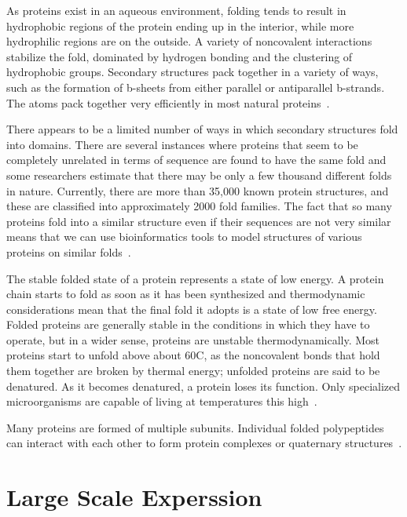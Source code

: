 \documentclass{report}
\begin{document}
As proteins exist in an aqueous environment, folding tends to result in hydrophobic regions of the protein ending up in the interior, while more hydrophilic regions are on the outside. A variety of noncovalent interactions stabilize the fold, dominated by hydrogen bonding and the clustering of hydrophobic groups. Secondary structures pack together in a variety of ways, such as the formation of b-sheets from either parallel or antiparallel b-strands. The atoms pack together very efficiently in most natural proteins~\cite{zvelebil_understanding_2008}.

There appears to be a limited number of ways in which secondary structures fold into domains. There are several instances where proteins that seem to be completely unrelated in terms of sequence are found to have the same fold and some researchers estimate that there may be only a few thousand different folds in nature. Currently, there are more than 35,000 known protein structures, and these are classified into approximately 2000 fold families. The fact that so many proteins fold into a similar structure even if their sequences are not very similar means that we can use bioinformatics tools to model structures of various proteins on similar folds~\cite{zvelebil_understanding_2008}.

The stable folded state of a protein represents a state of low energy. A protein chain starts to fold as soon as it has been synthesized and thermodynamic considerations mean that the final fold it adopts is a state of low free energy. Folded proteins are generally stable in the conditions in which they have to operate, but in a wider sense, proteins are unstable thermodynamically. Most proteins start to unfold above about 60C, as the noncovalent bonds that hold them together are broken by thermal energy; unfolded proteins are said to be denatured. As it becomes denatured, a protein loses its function. Only specialized microorganisms are capable of living at temperatures this high~\cite{zvelebil_understanding_2008}.

Many proteins are formed of multiple subunits. Individual folded polypeptides can interact with each other to form protein complexes or quaternary structures~\cite{zvelebil_understanding_2008}.

\section{Large Scale Experssion}
\end{document}
